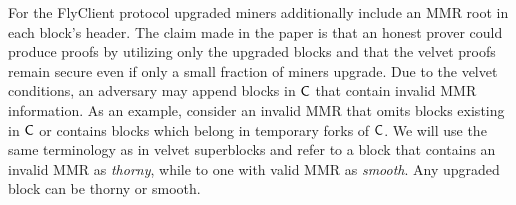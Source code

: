 %
	For the FlyClient protocol upgraded miners additionally include an MMR root in each block's header.
    The claim made in the paper is that an honest prover could produce proofs
    by utilizing only the upgraded blocks and that the velvet proofs remain secure even if only a small fraction of miners upgrade. 
    Due to the velvet conditions, an adversary may append blocks in $\mathsf{C}$ that contain invalid MMR information.
    As an example, consider an invalid MMR that omits blocks existing in $\mathsf{C}$ or contains blocks which belong in temporary forks of $\mathsf{C}$.
    We will use the same terminology as in velvet superblocks and refer to a block that contains an invalid MMR as \emph{thorny}, while to one with valid MMR as \emph{smooth}.
    Any upgraded block can be thorny or smooth.

